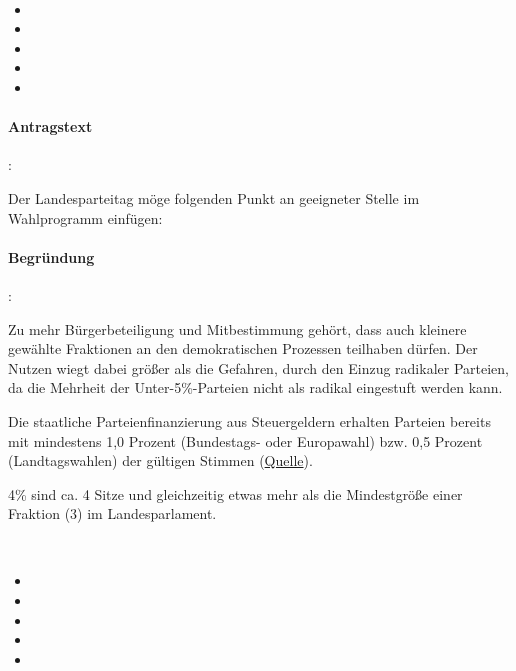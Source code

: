 
\label{wpa:prozenthuerde5}
\\
\begin{itemize}
\item {}
\item {}
\item {}
\item {}
\item {}
\end{itemize}

\paragraph{Antragstext}:

Der Landesparteitag möge folgenden Punkt an geeigneter Stelle im Wahlprogramm einfügen:


\paragraph{Begründung}:

Zu mehr Bürgerbeteiligung und Mitbestimmung gehört, dass auch kleinere gewählte Fraktionen an den demokratischen Prozessen teilhaben dürfen. Der Nutzen wiegt dabei größer als die Gefahren, durch den Einzug radikaler Parteien, da die Mehrheit der Unter-5\%-Parteien nicht als radikal eingestuft werden kann.

Die staatliche Parteienfinanzierung aus Steuergeldern erhalten Parteien bereits mit {\Gu}mindestens 1,0 Prozent (Bundestags- oder Europawahl) bzw. 0,5 Prozent (Landtagswahlen) der gültigen Stimmen{\Go} (\href{http://www.bpb.de/themen/513F3I,0,Staatliche_Parteienfinanzierung.html}{Quelle}). 

4\% sind ca. 4 Sitze und gleichzeitig etwas mehr als die Mindestgröße einer Fraktion (3) im Landesparlament. 


\label{wpa:prozenthuerde6}
\\
\begin{itemize}
\item {}
\item {}
\item {}
\item {}
\item {}
\end{itemize}

